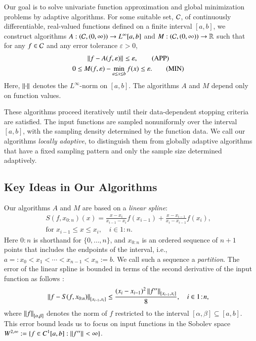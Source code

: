 \documentclass[review]{elsarticle}
\newcommand{\abstol}{\varepsilon}
\newcommand{\oton}{1\!:\!n}
\newcommand{\datasites}{x_{0:n}}
\theoremstyle{definition}
\renewcommand{\cw}{W}
\begin{document}
Our goal is to solve univariate function approximation and global minimization
problems by adaptive algorithms. For some suitable set, $\cc$, of continuously
differentiable, real-valued functions defined on a finite interval $[a,b]$, we
construct algorithms $A:(\cc,(0,\infty)) \to L^{\infty}[a,b]$ and $M:
(\cc,(0,\infty)) \to \reals$ such that for any $f \in \cc$ and any error
tolerance $\abstol > 0$, \begin{gather} \norm{f - A(f,\abstol)} \le \abstol,
\tag{APP} \label{appxprob} \\ 0 \le M(f,\abstol) - \min_{a \le x \le b} f(x) \le
\abstol. \tag{MIN} \label{optprob} \end{gather} Here, $\norm{\cdot}$ denotes the
$L^{\infty}$-norm on $[a,b]$. The algorithms $A$ and $M$ depend only on function
values.

These algorithms proceed iteratively until their data-dependent stopping
criteria are satisfied. The input functions are sampled nonuniformly over
the interval $[a,b]$, with the sampling density determined by the function data.
We call our algorithms \emph{locally adaptive}, to distinguish them from
globally adaptive algorithms that have a fixed sampling pattern and only the
sample size determined adaptively.

\subsection{Key Ideas in Our Algorithms} \label{subsec:keyideas}

Our algorithms $A$ and $M$ are based on a \emph{linear spline}:
\begin{multline} \label{splinedef}
   S(f,\datasites)(x) =
   \frac{x-x_i}{x_{i-1} - x_i} f(x_{i-1}) + \frac{x-x_{i-1}}{x_{i} - x_{i-1}}f(x_i),
\\ \text{for } x_{i-1} \le x \le x_i, \quad i \in \oton.
\end{multline}
Here ${0\!:\!n}$ is shorthand for $\{0, \ldots, n\}$, and $\datasites$ is an
ordered sequence of $n+1$ points that includes the endpoints of the interval,
i.e., $a=:x_0 <x_1 < \cdots < x_{n-1} < x_{n}:=b$. We call such a sequence a
\emph{partition}. The error of the linear spline is bounded in terms
of the second derivative of the input function as follows \cite[Theorem
3.3]{BurFaiBur16a}:
\begin{equation} \label{appxerrbda}
	\norm[{[x_{i-1},x_i]}]{f - S(f,\datasites)}
	\le \frac{(x_i - x_{i-1})^2\norm[{[x_{i-1},x_i]}]{f''}}{8}, \quad i \in \oton,
\end{equation}
where $\norm[{[\alpha,\beta]}]{f}$ denotes the norm of $f$ restricted to the
interval $[\alpha,\beta] \subseteq [a,b]$. This error bound leads us to focus on
input functions in the Sobolev space $\cw^{2,\infty} := \{f \in C^1[a,b] :
\norm{f''} < \infty \}$.
\end{document}
